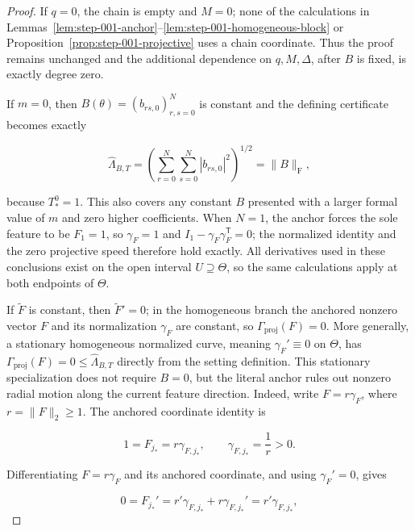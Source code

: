 \begin{proof}
If \(q=0\), the chain is empty and \(M=0\); none of the calculations in
Lemmas~\ref{lem:step-001-anchor}--\ref{lem:step-001-homogeneous-block} or
Proposition~\ref{prop:step-001-projective} uses a chain coordinate. Thus the proof remains unchanged and the
additional dependence on \(q,M,\Delta\), after \(B\) is fixed, is exactly degree zero.

If \(m=0\), then \(B(\theta)=(b_{rs,0})_{r,s=0}^N\) is constant and the defining certificate becomes exactly

\begin{equation}
\label{eq:appendix-display-024}
\widehat\Lambda_{B,T}
=\left(\sum_{r=0}^{N}\sum_{s=0}^{N}|b_{rs,0}|^2\right)^{1/2}
=\|B\|_{\mathrm F},
\end{equation}

because \(T_*^0=1\). This also covers any constant \(B\) presented with a larger formal value of \(m\) and
zero higher coefficients. When \(N=1\), the anchor forces the sole feature to be \(F_1=1\), so
\(\gamma_F=1\) and \(I_1-\gamma_F\gamma_F^{\mathsf T}=0\); the normalized identity and the zero projective
speed therefore hold exactly. All derivatives used in these conclusions exist on the open interval \(U\supseteq\Theta\), so
the same calculations apply at both endpoints of \(\Theta\).

If \(\widetilde F\) is constant, then \(\widetilde F'=0\); in the homogeneous branch the anchored nonzero
vector \(F\) and its normalization \(\gamma_F\) are constant, so \(\Gamma_{\mathrm{proj}}(F)=0\). More
generally, a stationary homogeneous normalized curve, meaning \(\gamma_F'\equiv0\) on \(\Theta\), has
\(\Gamma_{\mathrm{proj}}(F)=0\leq\widehat\Lambda_{B,T}\) directly from the setting definition. This stationary
specialization does not require \(B=0\), but the literal anchor rules out nonzero radial motion along the
current feature direction. Indeed, write \(F=r\gamma_F\), where \(r=\|F\|_2\geq1\). The anchored coordinate
identity is

\begin{equation}
\label{eq:appendix-display-025}
1=F_{j_*}=r\gamma_{F,j_*},
\qquad
\gamma_{F,j_*}=\frac1r>0.
\end{equation}

Differentiating \(F=r\gamma_F\) and its anchored coordinate, and using \(\gamma_F'=0\), gives

\begin{equation}
\label{eq:appendix-display-026}
0=F_{j_*}'=r'\gamma_{F,j_*}+r\gamma_{F,j_*}'
=r'\gamma_{F,j_*},
\end{equation}


\end{proof}
